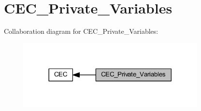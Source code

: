 \hypertarget{group___c_e_c___private___variables}{}\section{C\+E\+C\+\_\+\+Private\+\_\+\+Variables}
\label{group___c_e_c___private___variables}
Collaboration diagram for C\+E\+C\+\_\+\+Private\+\_\+\+Variables\+:
\nopagebreak
\begin{figure}[H]
\begin{center}
\leavevmode
\includegraphics[width=270pt]{group___c_e_c___private___variables}
\end{center}
\end{figure}
